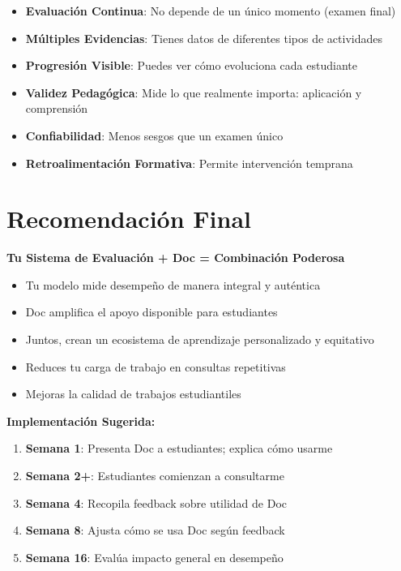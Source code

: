 \documentclass[
  spanish,
  12pt,
  letterpaper,
  DIV=11,
  numbers=noendperiod]{scrreprt}
\providecommand{\tightlist}{%
  \setlength{\itemsep}{0pt}\setlength{\parskip}{0pt}}
\begin{document}
\begin{itemize}
\tightlist
\item
  \textbf{Evaluación Continua}: No depende de un único momento (examen
  final)
\item
  \textbf{Múltiples Evidencias}: Tienes datos de diferentes tipos de
  actividades
\item
  \textbf{Progresión Visible}: Puedes ver cómo evoluciona cada
  estudiante
\item
  \textbf{Validez Pedagógica}: Mide lo que realmente importa: aplicación
  y comprensión
\item
  \textbf{Confiabilidad}: Menos sesgos que un examen único
\item
  \textbf{Retroalimentación Formativa}: Permite intervención temprana
\end{itemize}

\section{\texorpdfstring{\textbf{Recomendación Final
🌟}}{Recomendación Final 🌟}}\label{recomendaciuxf3n-final}

\textbf{Tu Sistema de Evaluación + Doc = Combinación Poderosa}

\begin{itemize}
\tightlist
\item
  Tu modelo mide desempeño de manera integral y auténtica
\item
  Doc amplifica el apoyo disponible para estudiantes
\item
  Juntos, crean un ecosistema de aprendizaje personalizado y equitativo
\item
  Reduces tu carga de trabajo en consultas repetitivas
\item
  Mejoras la calidad de trabajos estudiantiles
\end{itemize}

\textbf{Implementación Sugerida:}

\begin{enumerate}
\def\labelenumi{\arabic{enumi}.}
\tightlist
\item
  \textbf{Semana 1}: Presenta Doc a estudiantes; explica cómo usarme
\item
  \textbf{Semana 2+}: Estudiantes comienzan a consultarme
\item
  \textbf{Semana 4}: Recopila feedback sobre utilidad de Doc
\item
  \textbf{Semana 8}: Ajusta cómo se usa Doc según feedback
\item
  \textbf{Semana 16}: Evalúa impacto general en desempeño
\end{enumerate}
\end{document}

